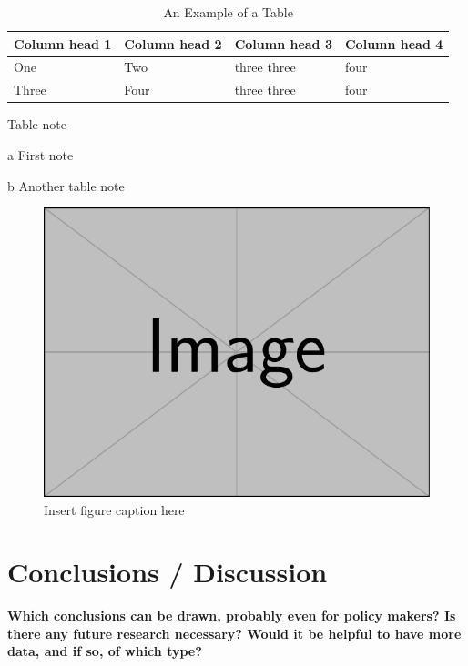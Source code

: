 \documentclass[
  journal=small,
  manuscript=mini-article,  %
  year=2023,
  volume=1,
]{odj-journal}
\begin{document}
\begin{table}[hbt!]
\begin{threeparttable}
\caption{An Example of a Table}
\label{table_example}
\begin{tabular}{llll}
\toprule
\headrow Column head 1 & Column head 2  & Column head 3 & Column head 4\\
\midrule
One\tnote{a} & Two&three three &four\\ 
\midrule
Three & Four&three three\tnote{b} &four\\
\bottomrule
\end{tabular}
\begin{tablenotes}[hang]
\item[]Table note
\item[a]First note
\item[b]Another table note
\end{tablenotes}
\end{threeparttable}
\end{table} 
\begin{figure}[hbt!]
\centering
\includegraphics[width=0.75\linewidth]{example-image.pdf}
\caption{Insert figure caption here}
\label{fig_sim}
\end{figure}


\section{Conclusions / Discussion}
\textbf{Which conclusions can be drawn, probably even for policy makers? Is there any future research necessary? Would it be helpful to have more data, and if so, of which type?}\lipsum[1] 








\end{document}
